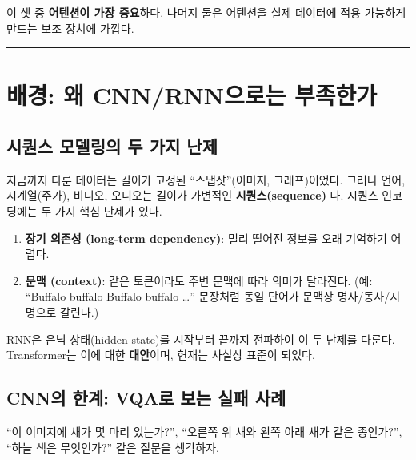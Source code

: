 \documentclass[
  korean,
]{article}
\providecommand{\tightlist}{%
  \setlength{\itemsep}{0pt}\setlength{\parskip}{0pt}}
\begin{document}
이 셋 중 \textbf{어텐션이 가장 중요}하다. 나머지 둘은 어텐션을 실제
데이터에 적용 가능하게 만드는 보조 장치에 가깝다.

\begin{center}\rule{0.5\linewidth}{0.5pt}\end{center}

\section{배경: 왜 CNN/RNN으로는 부족한가}\label{sec-motivation}

\subsection{시퀀스 모델링의 두 가지
난제}\label{uxc2dcuxd000uxc2a4-uxbaa8uxb378uxb9c1uxc758-uxb450-uxac00uxc9c0-uxb09cuxc81c}

지금까지 다룬 데이터는 길이가 고정된 ``스냅샷''(이미지, 그래프)이었다.
그러나 언어, 시계열(주가), 비디오, 오디오는 길이가 가변적인
\textbf{시퀀스(sequence)} 다. 시퀀스 인코딩에는 두 가지 핵심 난제가
있다.

\begin{enumerate}
\def\labelenumi{\arabic{enumi}.}
\tightlist
\item
  \textbf{장기 의존성 (long-term dependency)}: 멀리 떨어진 정보를 오래
  기억하기 어렵다.
\item
  \textbf{문맥 (context)}: 같은 토큰이라도 주변 문맥에 따라 의미가
  달라진다. (예: ``Buffalo buffalo Buffalo buffalo \ldots{}'' 문장처럼
  동일 단어가 문맥상 명사/동사/지명으로 갈린다.)
\end{enumerate}

RNN은 은닉 상태(hidden state)를 시작부터 끝까지 전파하여 이 두 난제를
다룬다. Transformer는 이에 대한 \textbf{대안}이며, 현재는 사실상 표준이
되었다.

\subsection{CNN의 한계: VQA로 보는 실패
사례}\label{cnnuxc758-uxd55cuxacc4-vqauxb85c-uxbcf4uxb294-uxc2e4uxd328-uxc0acuxb840}

\begin{tcolorbox}[enhanced jigsaw, arc=.35mm, bottomrule=.15mm, bottomtitle=1mm, breakable, colback=white, colbacktitle=quarto-callout-note-color!10!white, colframe=quarto-callout-note-color-frame, coltitle=black, left=2mm, leftrule=.75mm, opacityback=0, opacitybacktitle=0.6, rightrule=.15mm, title=\textcolor{quarto-callout-note-color}{\faInfo}\hspace{0.5em}{VQA(Visual Question Answering) 예시}, titlerule=0mm, toprule=.15mm, toptitle=1mm]

``이 이미지에 새가 몇 마리 있는가?'', ``오른쪽 위 새와 왼쪽 아래 새가
같은 종인가?'', ``하늘 색은 무엇인가?'' 같은 질문을 생각하자.

\end{tcolorbox}
\end{document}
